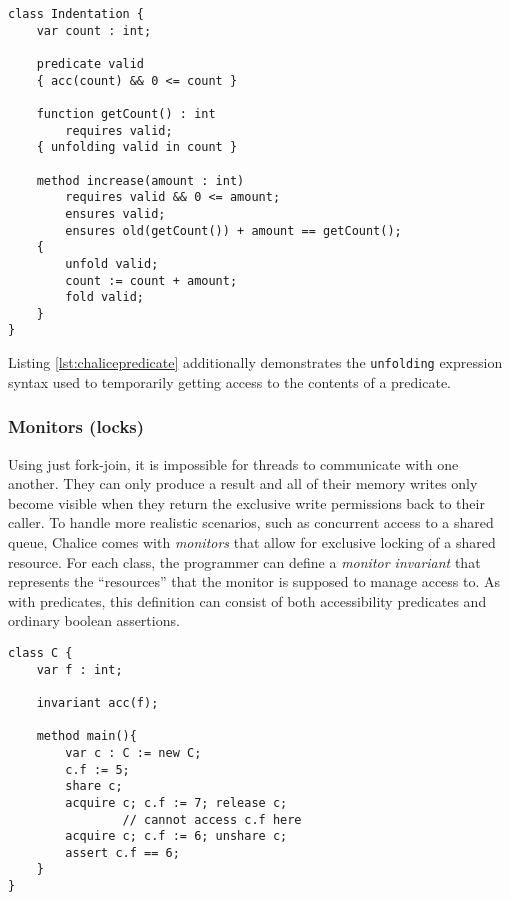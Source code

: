 \begin{lstlisting}[language=Chalice,float,caption={Using the predicate \lstinline!valid! to hide the representation of \lstinline!Indentation!},label={lst:chalicepredicate}]
class Indentation {
    var count : int;

    predicate valid
    { acc(count) && 0 <= count }

    function getCount() : int
        requires valid;
    { unfolding valid in count }

    method increase(amount : int)
        requires valid && 0 <= amount;
        ensures valid;
        ensures old(getCount()) + amount == getCount();
    {
        unfold valid;
        count := count + amount;
        fold valid;
    }
}
\end{lstlisting}

Listing \ref{lst:chalicepredicate} additionally demonstrates the \lstinline[language=Chalice]!unfolding! expression syntax used to temporarily getting access to the contents of a predicate.

\subsubsection{Monitors (locks)}\label{sct:back-monitors}
Using just fork-join, it is impossible for threads to communicate with one another. 
They can only produce a result and all of their memory writes only become visible when they return the exclusive write permissions back to their caller.
To handle more realistic scenarios, such as concurrent access to a shared queue, Chalice comes with \emph{monitors} that allow for exclusive locking of a shared resource.
For each class, the programmer can define a \emph{monitor invariant} that represents the ``resources'' that the monitor is supposed to manage access to. 
As with predicates, this definition can consist of both accessibility predicates and ordinary boolean assertions.

\begin{lstlisting}[language=Chalice,float,caption={Example of the life-cycle an object can go through in Chalice},label={lst:chalicemoncycle}]
class C {
    var f : int;

    invariant acc(f);

    method main(){
        var c : C := new C;
        c.f := 5;
        share c;
        acquire c; c.f := 7; release c;
				// cannot access c.f here
        acquire c; c.f := 6; unshare c;
        assert c.f == 6;
    }
}
\end{lstlisting}


